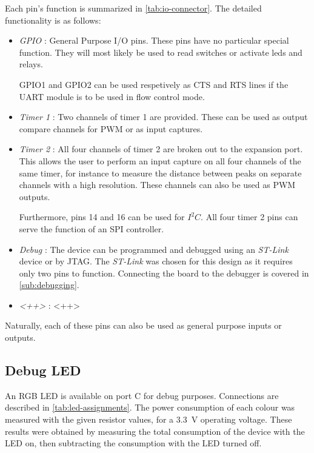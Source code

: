 Each pin's function is summarized in \autoref{tab:io-connector}. The detailed
functionality is as follows:

\begin{itemize}
  \item \emph{GPIO} : General Purpose I/O pins. These pins have no particular
    special function. They will most likely be used to read switches or activate
    leds and relays.
    
    GPIO1 and GPIO2 can be used respetively as CTS and RTS lines if the UART
    module is to be used in flow control mode.
  \item \emph{Timer 1} : Two channels of timer 1 are provided. These can be used
    as output compare channels for \ac{PWM} or as input captures.
  \item \emph{Timer 2} : All four channels of timer 2 are broken out to the
    expansion port. This allows the user to perform an input capture on all four
    channels of the same timer, for instance to measure the distance between
    peaks on separate channels with a high resolution. These channels can also
    be used as \ac{PWM} outputs.

    Furthermore, pins 14 and 16 can be used for $I^{2}C$. All four timer 2 pins
    can serve the function of an SPI controller.
  \item \emph{Debug} : The device can be programmed and debugged using an
    \emph{ST-Link} device or by JTAG. The \emph{ST-Link} was chosen for this
    design as it requires only two pins to function. Connecting the board to the
    debugger is covered in \autoref{sub:debugging}.
  \item \emph{<++>} : <++>
\end{itemize}

Naturally, each of these pins can also be used as general purpose inputs or
outputs.

\subsection{Debug LED}

An RGB LED is available on port C for debug purposes. Connections are described
in \autoref{tab:led-assignments}. The power consumption of each colour was
measured with the given resistor values, for a \SI{3.3}{V} operating voltage.
These results were obtained by measuring the total consumption of the device
with the LED on, then subtracting the consumption with the LED turned off.

